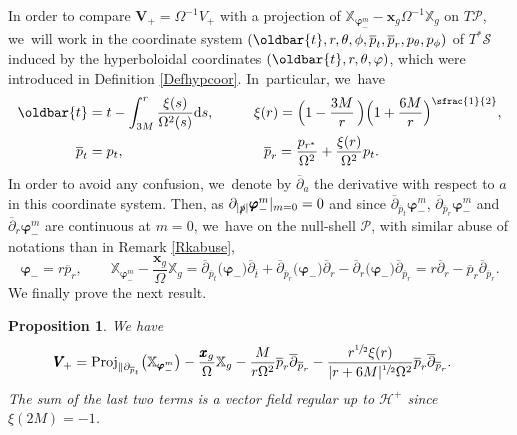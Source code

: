 \documentclass[JEP,XML,SOM,Unicode,published]{cedram}
\let\bar\oldbar
\theoremstyle{plain}
\newtheorem{proposition}{Proposition}[section]
\theoremstyle{definition}
\newcommand\T{{\mathbb{X}}}
\renewcommand\H{{\mathcal{H}^+}}
\newcommand\dr{{\mathrm{d}}}
\begin{document}
In order to compare $\pmb{V}_{\!+}=\Omega^{-1}V_+$ with a projection of $\T_{\pmb{\varphi}_-^m}-\pmb{x}_g \Omega^{-1} \T_g$ on $T \mathcal{P}$, we~will work in the coordinate system $(\bar{t},r,\theta, \phi, \overline{p}_t, \overline{p}_r, p_\theta, p_\phi)$ of $T^*\mathcal{S}$ induced by the hyperboloidal coordinates $(\bar{t},r,\theta, \varphi)$, which were introduced in Definition \ref{Defhypcoor}. In~particular, we~have
\begin{alignat*}{2}
\bar{t} & = t-\int_{3M}^r \frac{\xi(s)}{\Omega^2(s)} \dr s, \qquad &&\xi(r)=\Bigl(1-\frac{3M}{r} \, \Bigr) \Bigl(1+\frac{6M}{r} \Bigr)^{\sfrac{1}{2}}, \\
\overline{p}_t&=p_t, \qquad && \; \; \, \overline{p}_r=\frac{p_{r^*}}{\Omega^2}+\frac{\xi(r)}{ \Omega^2}p_t.
\end{alignat*}
In order to avoid any confusion, we~denote by $\overline{\partial}_a$ the derivative with respect to $a$ in this coordinate system. Then, as $ \partial_{|\slashed{p}|} \pmb{\varphi}_-^m\vert_{m=0}=0$ and since $\overline{\partial}_{\overline{p}_t} \pmb{\varphi}_-^m$, $ \overline{\partial}_{\overline{p}_r} \pmb{\varphi}_-^m$ and $ \overline{\partial}_r \pmb{\varphi}_-^m$ are continuous at $m=0$, we~have on the null-shell $\mathcal{P}$, with similar abuse of notations than in Remark \ref{Rkabuse},
\[
\pmb{\varphi}_-=r \overline{p}_r,\qquad \T_{\pmb{\varphi}_-^m}-\frac{\pmb{x}_g}{\Omega} \T_g= \overline{\partial}_{\overline{p}_t} \bigl(\pmb{\varphi}_- \bigr)\overline{\partial}_{\overline{t}}+\overline{\partial}_{\overline{p}_r} \bigl(\pmb{\varphi}_- \bigr) \overline{\partial}_{r}-\overline{\partial}_{r}\bigl(\pmb{\varphi}_- \bigr) \overline{\partial}_{\overline{p}_r}=r\overline{\partial}_r-\overline{p}_r \overline{\partial}_{\overline{p}_r}.
\]
We finally prove the next result.
\begin{proposition}\label{ProprojrescVplus}
We have
\begin{align*}
\pmb{V}_{\! +} & = \mathrm{Proj}_{\parallel \partial_{\overline{p}_t}} \bigl(\T_{\pmb{\varphi}_-^m} \bigr)-\frac{\pmb{x}_g}{\Omega} \T_g - \frac{M }{r \Omega^2} \overline{p}_r \overline{\partial}_{\overline{p}_r}-\frac{r^{\sfrac{1}{2}}\xi(r)}{|r+6M|^{\sfrac{1}{2}}\Omega^2} \overline{p}_r \overline{\partial}_{\overline{p}_r}.
\end{align*}
The sum of the last two terms is a vector field regular up to $\H$ since $\xi(2M)=-1$.
\end{proposition}
\end{document}
